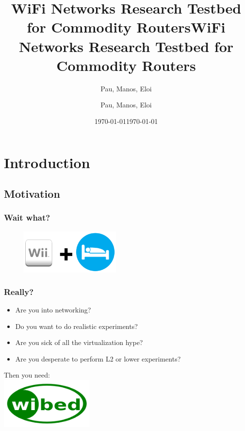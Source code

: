 \documentclass[usepdftitle=false,13pt]{beamer}
\title[WiFi Networks Research Testbed for Commodity Routers]{WiFi Networks Research Testbed for Commodity Routers}
\author[{Pau, Manos, Eloi}]{Pau, Manos, Eloi}
\institute[{UPC, Guifi.net}]{UPC, Guifi.net}
\date[\today]{\today}
\begin{document}
\title[WiBed\hspace{20em}\insertframenumber/\inserttotalframenumber]{WiFi Networks Research Testbed for Commodity Routers}  
\author[Pau@Guifi,\{Manos,Eloi\}@UPC ]{ Pau, Manos, Eloi\\
 }

\date{\today} 

\frame{\titlepage}




\section{Introduction}
\subsection{Motivation}

\begin{frame}\frametitle{Wait what?}

\begin{figure}[h!]
\begin{center}
\includegraphics[width=0.45\textwidth]{pic/Wiibed}
\end{center}
\end{figure}

\end{frame}



\begin{frame}\frametitle{Really?}

	\begin{itemize}
		\item Are you into networking?
		\pause
		\item Do you want to do realistic experiments?
		\pause
		\item Are you sick of all the virtualization hype?
		\pause
		\item Are you desperate to perform L2 or lower experiments?
	\end{itemize}
	\pause
	\begin{center}
	Then you need:\\
	\includegraphics[width=0.35\textwidth]{pic/wibed-logo}
	\end{center}

\end{frame}
\end{document}
